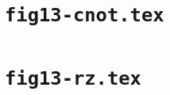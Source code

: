 \documentclass{article}
\begin{document}
\section*{\texttt{fig13-cnot.tex}}

\clearpage
\section*{\texttt{fig13-rz.tex}}

\clearpage
\end{document}
